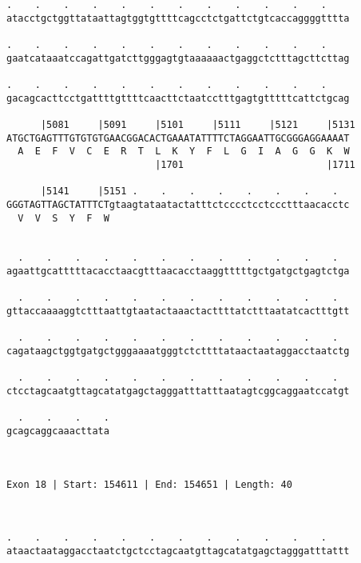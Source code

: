 \documentclass{article}
\begin{document}
\begin{Verbatim}
.    .    .    .    .    .    .    .    .    .    .    .    
atacctgctggttataattagtggtgttttcagcctctgattctgtcaccaggggtttta
                                                            
.    .    .    .    .    .    .    .    .    .    .    .    
gaatcataaatccagattgatcttgggagtgtaaaaaactgaggctctttagcttcttag
                                                            
.    .    .    .    .    .    .    .    .    .    .    .    
gacagcacttcctgattttgttttcaacttctaatcctttgagtgtttttcattctgcag
                                                            
      |5081     |5091     |5101     |5111     |5121     |5131
ATGCTGAGTTTGTGTGTGAACGGACACTGAAATATTTTCTAGGAATTGCGGGAGGAAAAT
  A  E  F  V  C  E  R  T  L  K  Y  F  L  G  I  A  G  G  K  W
                          |1701                         |1711
  
      |5141     |5151 .    .    .    .    .    .    .    .  
GGGTAGTTAGCTATTTCTgtaagtataatactatttctcccctcctccctttaacacctc
  V  V  S  Y  F  W                                          
                                                            
  
  .    .    .    .    .    .    .    .    .    .    .    .  
agaattgcatttttacacctaacgtttaacacctaaggtttttgctgatgctgagtctga
                                                            
  .    .    .    .    .    .    .    .    .    .    .    .  
gttaccaaaaggtctttaattgtaatactaaactacttttatctttaatatcactttgtt
                                                            
  .    .    .    .    .    .    .    .    .    .    .    .  
cagataagctggtgatgctgggaaaatgggtctcttttataactaataggacctaatctg
                                                            
  .    .    .    .    .    .    .    .    .    .    .    .  
ctcctagcaatgttagcatatgagctagggatttatttaatagtcggcaggaatccatgt
                                                            
  .    .    .    .
gcagcaggcaaacttata
                  
                  
 
Exon 18 | Start: 154611 | End: 154651 | Length: 40



.    .    .    .    .    .    .    .    .    .    .    .    
ataactaataggacctaatctgctcctagcaatgttagcatatgagctagggatttattt
                                                            

\end{Verbatim}
\end{document}
